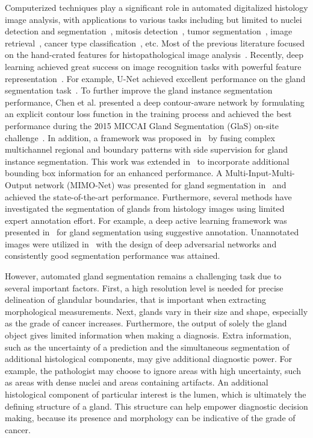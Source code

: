 \documentclass[3p]{elsarticle}
\begin{document}
Computerized techniques play a significant role in automated digitalized histology image analysis, with applications to various tasks including but limited to nuclei detection and segmentation~\citep{graham2018sams,chen2017dcan,sirinukunwattana2016locality}, mitosis detection~\citep{cirecsan2013mitosis,chen2016mitosis,veta2015assessment,albarqouni2016aggnet}, tumor segmentation~\citep{qaiser2017tumor}, image retrieval~\citep{sapkota2018deep,shi2017supervised}, cancer type classification~\citep{graham2018classification,kong2017cancer,bejnordi2017diagnostic,lin2018scannet,qaiser2018her}, etc.
Most of the previous literature focused on the hand-crated features for histopathological image analysis~\citep{gurcan2009histopathological}. 
Recently, deep learning achieved great success on image recognition tasks with powerful feature representation~\citep{litjens2017survey,shen2017deep,lecun2015deep}. 
For example, U-Net achieved excellent performance on the gland segmentation task~\citep{ronneberger2015u}. To further improve the gland instance segmentation performance, Chen et al. presented a deep contour-aware network by formulating an explicit contour loss function in the training process and achieved the best performance during the 2015 MICCAI Gland Segmentation (GlaS) on-site challenge~\citep{chen2016dcan,chen2017dcan,sirinukunwattana2017gland}.
In addition, a framework was proposed in~\cite{xu2016gland} by fusing complex multichannel regional and boundary patterns with side supervision for gland instance segmentation. This work was extended in~\cite{xu2017gland} to incorporate additional bounding box information for an enhanced performance.
A Multi-Input-Multi-Output network (MIMO-Net) was presented for gland segmentation in~\cite{raza2017mimonet} and achieved the state-of-the-art performance.
Furthermore, several methods have investigated the segmentation of glands from histology images using limited expert annotation effort. For example, a deep active learning framework was presented in~\cite{yang2017suggestive} for gland segmentation using suggestive annotation. Unannotated images were utilized in~\cite{zhang2017deep} with the design of deep adversarial networks and consistently good segmentation performance was attained.

However, automated gland segmentation remains a challenging task due to several important factors. First, a high resolution level is needed for precise delineation of glandular boundaries, that is important when extracting morphological measurements.  Next, glands vary in their size and shape, especially as the grade of cancer increases. Furthermore, the output of solely the gland object gives limited information when making a diagnosis. Extra information, such as the uncertainty of a prediction and the simultaneous segmentation of additional histological components, may give additional diagnostic power. For example, the pathologist may choose to ignore areas with high uncertainty, such as areas with dense nuclei and areas containing artifacts. An additional histological component of particular interest is the lumen, which is ultimately the defining structure of a gland. This structure can help empower diagnostic decision making, because its presence and morphology can be indicative of the grade of cancer.
\end{document}
